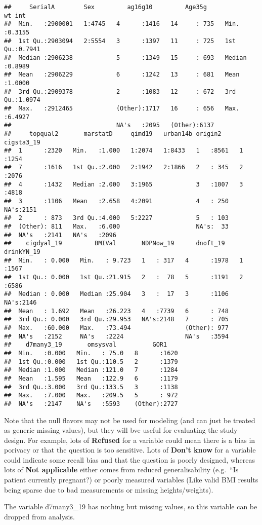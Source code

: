 \documentclass[
  11pt,
]{article}
\begin{document}
\begin{verbatim}
##     SerialA        Sex         ag16g10         Age35g         wt_int      
##  Min.   :2900001   1:4745   4      :1416   14     : 735   Min.   :0.3155  
##  1st Qu.:2903094   2:5554   3      :1397   11     : 725   1st Qu.:0.7941  
##  Median :2906238            5      :1349   15     : 693   Median :0.8989  
##  Mean   :2906229            6      :1242   13     : 681   Mean   :1.0000  
##  3rd Qu.:2909378            2      :1083   12     : 672   3rd Qu.:1.0974  
##  Max.   :2912465            (Other):1717   16     : 656   Max.   :6.4927  
##                             NA's   :2095   (Other):6137                   
##     topqual2       marstatD     qimd19   urban14b origin2     cigsta3_19 
##  1      :2320   Min.   :1.000   1:2074   1:8433   1   :8561   1   :1254  
##  7      :1616   1st Qu.:2.000   2:1942   2:1866   2   : 345   2   :2076  
##  4      :1432   Median :2.000   3:1965            3   :1007   3   :4818  
##  3      :1106   Mean   :2.658   4:2091            4   : 250   NA's:2151  
##  2      : 873   3rd Qu.:4.000   5:2227            5   : 103              
##  (Other): 811   Max.   :6.000                     NA's:  33              
##  NA's   :2141   NA's   :2096                                             
##    cigdyal_19         BMIVal       NDPNow_19      dnoft_19    drinkYN_19 
##  Min.   : 0.000   Min.   : 9.723   1   : 317   4      :1978   1   :1567  
##  1st Qu.: 0.000   1st Qu.:21.915   2   :  78   5      :1191   2   :6586  
##  Median : 0.000   Median :25.904   3   :  17   3      :1106   NA's:2146  
##  Mean   : 1.692   Mean   :26.223   4   :7739   6      : 748              
##  3rd Qu.: 0.000   3rd Qu.:29.953   NA's:2148   7      : 705              
##  Max.   :60.000   Max.   :73.494               (Other): 977              
##  NA's   :2152     NA's   :2224                 NA's   :3594              
##    d7many3_19       omsysval          GOR1     
##  Min.   :0.000   Min.   : 75.0   8      :1620  
##  1st Qu.:0.000   1st Qu.:110.5   2      :1379  
##  Median :1.000   Median :121.0   7      :1284  
##  Mean   :1.595   Mean   :122.9   6      :1179  
##  3rd Qu.:3.000   3rd Qu.:133.5   3      :1138  
##  Max.   :7.000   Max.   :209.5   5      : 972  
##  NA's   :2147    NA's   :5593    (Other):2727
\end{verbatim}

Note that the null flavors may not be used for modeling (and can just be
treated as generic missing values), but they will bve useful for
evaluating the study design. For example, lots of \textbf{Refused} for a
variable could mean there is a bias in porivacy or that the question is
too sensitive. Lots of \textbf{Don't know} for a variable could indicate
some recall bias and that the question is poorly designed, whereas lots
of \textbf{Not applicable} either comes from reduced generalisability
(e.g.~``Is patient currently pregnant?) or poorly measured variables
(Like valid BMI results being sparse due to bad measurements or missing
heights/weights).

The variable d7many3\_19 has nothing but missing values, so this
variable can be dropped from analysis.
\end{document}
